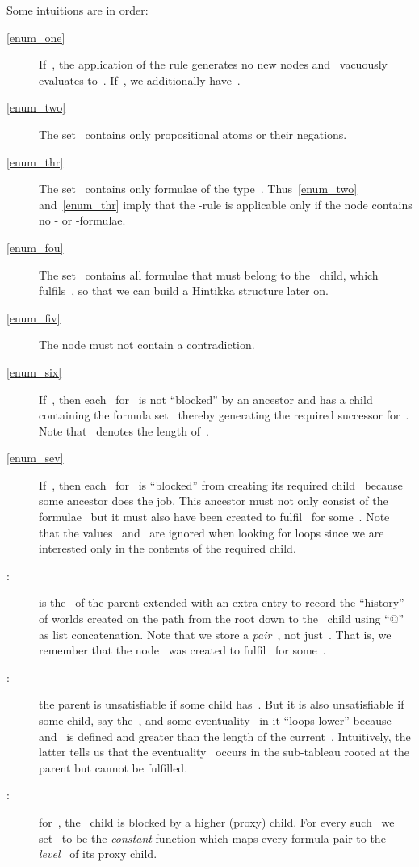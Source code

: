 \documentclass{entcs}
\newcommand{\trea}{}
\begin{document}
\begin{center}
Some intuitions are in order:
\begin{description}
\item[\rm \ref{enum_one}]
  If~, the application of the rule generates no new nodes
  and~ vacuously evaluates to~.
  If~, we additionally have~.
\item[\rm \ref{enum_two}] The set~ contains only propositional atoms or their negations.
\item[\rm \ref{enum_thr}] The set~ contains only formulae of the type~.
  Thus~\ref{enum_two} and~\ref{enum_thr} imply
  that the \trea{}-rule is applicable only
  if the node contains no - or -formulae.
\item[\rm \ref{enum_fou}] The set~ contains all formulae
  that must belong to the ~child, which fulfils~,
  so that we can build a Hintikka structure later on.
\item[\rm \ref{enum_fiv}] The node must not contain a contradiction.
\item[\rm \ref{enum_six}] If~,
  then each~ for~ is not ``blocked'' by an ancestor
  and has a child containing the formula set~
  thereby generating the required successor for~.
  Note that~ denotes the length of~.
\item[\rm \ref{enum_sev}] If~,
  then each~ for~ is ``blocked''
  from creating its required child~
  because some ancestor does the job.
  This ancestor must not only consist of the formulae~
  but it must also have been created to fulfil~ for some~.
  Note that the values~ and~ are ignored
  when looking for loops
  since we are interested only in the contents of the required child.
\item[\rm :] is the~ of the parent
  extended with an extra entry to record the ``history''
  of worlds created on the path from the root down to the ~child
  using ``@'' as list concatenation.
  Note that we store a \emph{pair}~, not just~.
  That is, we remember that the node~ was created
  to fulfil~ for some~.
\item[\rm :] the parent is unsatisfiable
  if some child has~.
  But it is also unsatisfiable if some child, say the~,
  and some eventuality~ in it ``loops lower''
  because~
  and~ is defined and greater than the length of the current~.
  Intuitively, the latter tells us
  that the eventuality~
  occurs in the sub-tableau rooted at the parent
  but cannot be fulfilled.
\item[\rm :] for~, the ~child is blocked
  by a higher (proxy) child.
  For every such~
  we set~ to be the \emph{constant} function
  which maps every formula-pair to the \emph{level}~ of its proxy child.

\end{description}
\end{center}
\end{document}

